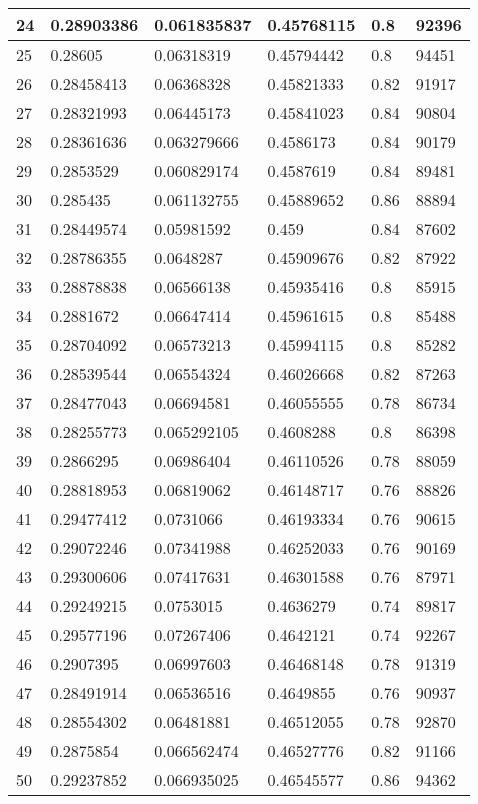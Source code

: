 \begin{longtable}{|l|l|l|l|l|l|}
24 & 0.28903386 & 0.061835837 & 0.45768115 & 0.8 & 92396 \\ \hline 
25 & 0.28605 & 0.06318319 & 0.45794442 & 0.8 & 94451 \\ \hline 
26 & 0.28458413 & 0.06368328 & 0.45821333 & 0.82 & 91917 \\ \hline 
27 & 0.28321993 & 0.06445173 & 0.45841023 & 0.84 & 90804 \\ \hline 
28 & 0.28361636 & 0.063279666 & 0.4586173 & 0.84 & 90179 \\ \hline 
29 & 0.2853529 & 0.060829174 & 0.4587619 & 0.84 & 89481 \\ \hline 
30 & 0.285435 & 0.061132755 & 0.45889652 & 0.86 & 88894 \\ \hline 
31 & 0.28449574 & 0.05981592 & 0.459 & 0.84 & 87602 \\ \hline 
32 & 0.28786355 & 0.0648287 & 0.45909676 & 0.82 & 87922 \\ \hline 
33 & 0.28878838 & 0.06566138 & 0.45935416 & 0.8 & 85915 \\ \hline 
34 & 0.2881672 & 0.06647414 & 0.45961615 & 0.8 & 85488 \\ \hline 
35 & 0.28704092 & 0.06573213 & 0.45994115 & 0.8 & 85282 \\ \hline 
36 & 0.28539544 & 0.06554324 & 0.46026668 & 0.82 & 87263 \\ \hline 
37 & 0.28477043 & 0.06694581 & 0.46055555 & 0.78 & 86734 \\ \hline 
38 & 0.28255773 & 0.065292105 & 0.4608288 & 0.8 & 86398 \\ \hline 
39 & 0.2866295 & 0.06986404 & 0.46110526 & 0.78 & 88059 \\ \hline 
40 & 0.28818953 & 0.06819062 & 0.46148717 & 0.76 & 88826 \\ \hline 
41 & 0.29477412 & 0.0731066 & 0.46193334 & 0.76 & 90615 \\ \hline 
42 & 0.29072246 & 0.07341988 & 0.46252033 & 0.76 & 90169 \\ \hline 
43 & 0.29300606 & 0.07417631 & 0.46301588 & 0.76 & 87971 \\ \hline 
44 & 0.29249215 & 0.0753015 & 0.4636279 & 0.74 & 89817 \\ \hline 
45 & 0.29577196 & 0.07267406 & 0.4642121 & 0.74 & 92267 \\ \hline 
46 & 0.2907395 & 0.06997603 & 0.46468148 & 0.78 & 91319 \\ \hline 
47 & 0.28491914 & 0.06536516 & 0.4649855 & 0.76 & 90937 \\ \hline 
48 & 0.28554302 & 0.06481881 & 0.46512055 & 0.78 & 92870 \\ \hline 
49 & 0.2875854 & 0.066562474 & 0.46527776 & 0.82 & 91166 \\ \hline 
50 & 0.29237852 & 0.066935025 & 0.46545577 & 0.86 & 94362 \\ \hline 
\end{longtable}
